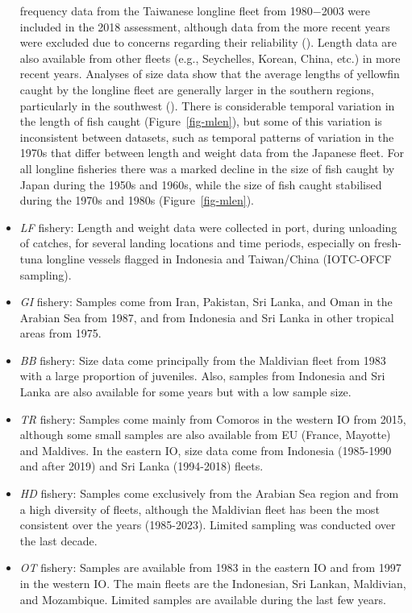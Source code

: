 \documentclass[
]{scrartcl}
\begin{document}
\begin{itemize}
  frequency data from the Taiwanese longline fleet from 1980−2003 were
  included in the 2018 assessment, although data from the more recent
  years were excluded due to concerns regarding their reliability
  (). Length data are also available from other fleets (e.g.,
  Seychelles, Korean, China, etc.) in more recent years. Analyses of
  size data show that the average lengths of yellowfin caught by the
  longline fleet are generally larger in the southern regions,
  particularly in the southwest
  (). There is
  considerable temporal variation in the length of fish caught
  (Figure~\ref{fig-mlen}), but some of this variation is inconsistent
  between datasets, such as temporal patterns of variation in the 1970s
  that differ between length and weight data from the Japanese fleet.
  For all longline fisheries there was a marked decline in the size of
  fish caught by Japan during the 1950s and 1960s, while the size of
  fish caught stabilised during the 1970s and 1980s
  (Figure~\ref{fig-mlen}).
\item
  \emph{LF} fishery: Length and weight data were collected in port,
  during unloading of catches, for several landing locations and time
  periods, especially on fresh-tuna longline vessels flagged in
  Indonesia and Taiwan/China (IOTC-OFCF sampling).
\item
  \emph{GI} fishery: Samples come from Iran, Pakistan, Sri Lanka, and
  Oman in the Arabian Sea from 1987, and from Indonesia and Sri Lanka in
  other tropical areas from 1975.
\item
  \emph{BB} fishery: Size data come principally from the Maldivian fleet
  from 1983 with a large proportion of juveniles. Also, samples from
  Indonesia and Sri Lanka are also available for some years but with a
  low sample size.
\item
  \emph{TR} fishery: Samples come mainly from Comoros in the western IO
  from 2015, although some small samples are also available from EU
  (France, Mayotte) and Maldives. In the eastern IO, size data come from
  Indonesia (1985-1990 and after 2019) and Sri Lanka (1994-2018) fleets.
\item
  \emph{HD} fishery: Samples come exclusively from the Arabian Sea
  region and from a high diversity of fleets, although the Maldivian
  fleet has been the most consistent over the years (1985-2023). Limited
  sampling was conducted over the last decade.
\item
  \emph{OT} fishery: Samples are available from 1983 in the eastern IO
  and from 1997 in the western IO. The main fleets are the Indonesian,
  Sri Lankan, Maldivian, and Mozambique. Limited samples are available
  during the last few years.
\end{itemize}
\end{document}
